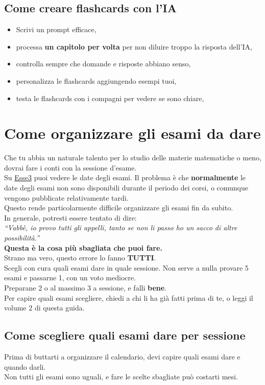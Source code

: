 \documentclass{article}
\begin{document}
\subsection{Come creare flashcards con l'IA}
\begin{itemize}
\item Scrivi un prompt efficace,
\item processa \textbf{un capitolo per volta} per non diluire troppo la risposta dell'IA,
\item controlla sempre che domande e risposte abbiano senso,
\item personalizza le flashcards aggiungendo esempi tuoi,
\item testa le flashcards con i compagni per vedere se sono chiare,
\end{itemize}


\section{Come organizzare gli esami da dare}
Che tu abbia un naturale talento per lo studio delle materie matematiche o meno, dovrai fare i conti con la sessione d'esame.\\
Su \href{https://uniud.esse3.cineca.it/Home.do}{Esse3} puoi vedere le date degli esami. Il problema è che \textbf{normalmente} le date degli esami non sono disponibili durante il periodo dei corsi, o comunque vengono pubblicate relativamente tardi.\\
Questo rende particolarmente difficile organizzare gli esami fin da subito.\\
In generale, potresti essere tentato di dire:\\
\textit{``Vabbè, io provo tutti gli appelli, tanto se non li passo ho un sacco di altre possibilità.''}\\
\textbf{Questa è la cosa più sbagliata che puoi fare.}\\
Strano ma vero, questo errore lo fanno \textbf{TUTTI}.\\
Scegli con cura quali esami dare in quale sessione. Non serve a nulla provare 5 esami e passarne 1, con un voto mediocre.\\
Preparane 2 o al massimo 3 a sessione, e falli \textbf{bene}.\\
Per capire quali esami scegliere, chiedi a chi li ha già fatti prima di te, o leggi il volume 2 di questa guida.


\subsection{Come scegliere quali esami dare per sessione}
Prima di buttarti a organizzare il calendario, devi capire quali esami dare e quando darli.\\
Non tutti gli esami sono uguali, e fare le scelte sbagliate può costarti mesi.
\end{document}
